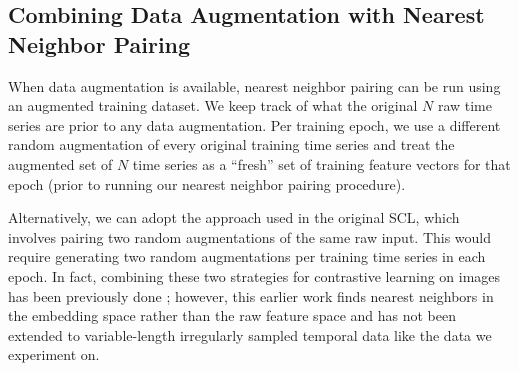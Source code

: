 \subsection{Combining Data Augmentation with Nearest Neighbor Pairing}
\label{ch02:sec:data-augmentation-with-nn-pairing}

When data augmentation is available, nearest neighbor pairing can be run using an augmented training dataset.
We keep track of what the original $N$ raw time series are prior to any data augmentation.
Per training epoch, we use a different random augmentation of every original training time series and treat the augmented set of $N$ time series as a ``fresh'' set of training feature vectors for that epoch (prior to running our nearest neighbor pairing procedure).

Alternatively, we can adopt the approach used in the original SCL, which involves pairing two random augmentations of the same raw input.
This would require generating two random augmentations per training time series in each epoch.
In fact, combining these two strategies for contrastive learning on images has been previously done \citep{dwibedi2021little}; however, this earlier work finds nearest neighbors in the embedding space rather than the raw feature space and has not been extended to variable-length irregularly sampled temporal data like the data we experiment on.


